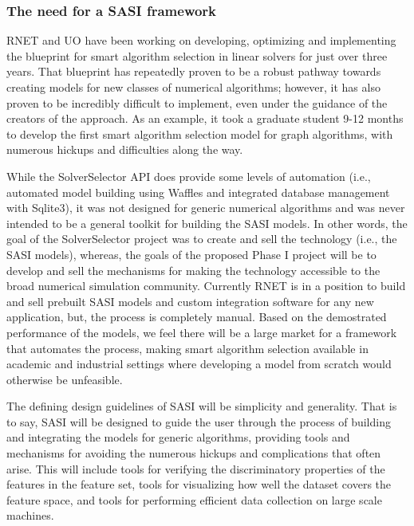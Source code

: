 \subsubsection{The need for a SASI framework} 

RNET and UO have been working on developing, optimizing and implementing the blueprint for smart algorithm selection in linear solvers for just over three years. That blueprint has repeatedly proven to be a robust pathway towards creating models for new classes of numerical algorithms; however, it has also proven to be incredibly difficult to implement, even under the guidance of the creators of the approach. As an example, it took a graduate student 9-12 months to develop the first smart algorithm selection model for graph algorithms, with numerous hickups and difficulties along the way. 

While the SolverSelector API does provide some levels of automation (i.e., automated model building using Waffles and integrated database management with Sqlite3), it was not designed for generic numerical algorithms and was never intended to be a general toolkit for building the SASI models. In other words, the goal of the SolverSelector project was to create and sell the technology (i.e., the SASI models), whereas, the goals of the proposed Phase I project will be to develop and sell the mechanisms for making the technology accessible to the broad numerical simulation community. Currently RNET is in a position to build and sell prebuilt SASI models and custom integration software for any new application, but, the process is completely manual. Based on the demostrated performance of the models, we feel there will be a large market for a framework that automates the process, making smart algorithm selection available in academic and industrial settings where developing a model from scratch would otherwise be unfeasible.  

The defining design guidelines of SASI will be simplicity and generality. That is to say, SASI will be designed to guide the user through the process of building and integrating the models for generic algorithms, providing tools and mechanisms for avoiding the numerous hickups and complications that often arise. This will include tools for verifying the discriminatory properties of the features in the feature set, tools for visualizing how well the dataset covers the feature space, and tools for performing efficient data collection on large scale machines. 

